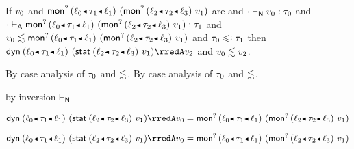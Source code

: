 \begin{lemma}\label{HA-S-compat-2}
  If\/ $v_0$ and\/ ${\emopt{\obnd{\sowner_0}{\stype_1}{\sowner_1}}{(\emopt{\obnd{\sowner_2}{\stype_2}{\sowner_3}}{\svalue_1})}}$ are \reducedsurfaceexpressions{}
  and\/ ${\cdot} \vdash_{\mathsf{N}} v_0 : \tau_0$
  and\/ $\snil \sWTA {\emopt{\obnd{\sowner_0}{\stype_1}{\sowner_1}}{(\emopt{\obnd{\sowner_2}{\stype_2}{\sowner_3}}{\svalue_1})}} : \stype_1$
  and\/ $\rexpr{\svalue_0}{\emopt{\obnd{\sowner_0}{\stype_1}{\sowner_1}}{(\emopt{\obnd{\sowner_2}{\stype_2}{\sowner_3}}{\svalue_1})}}$
  and\/ $\stype_0 \subteq \stype_1$
  then\/ $\edynb{\obnd{\sowner_0}{\stype_1}{\sowner_1}}{(\estab{\obnd{\sowner_2}{\stype_2}{\sowner_3}}{\svalue_1})} \rredA \svalue_2$
  and\/ $v_0 \lesssim v_2$.
\end{lemma}{
  \newcommand{\shortpf}{By case analysis of $\stype_0$ and $\srexpr$.}
\begin{lamportproof*}
  \shortpf
\mainproof
  \shortpf

    \begin{pfproof}
        \begin{pfproof}
          by inversion $\vdash_{\mathsf{N}}$
        \end{pfproof}
        \begin{pfproof}
          \qedstep
            \begin{pfproof}
              $\edynb{\obnd{\sowner_0}{\stype_1}{\sowner_1}}{(\estab{\obnd{\sowner_2}{\stype_2}{\sowner_3}}{\svalue_1})} \rredA \svalue_0 \feq \emopt{\obnd{\sowner_0}{\stype_1}{\sowner_1}}{(\emopt{\obnd{\sowner_2}{\stype_2}{\sowner_3}}{\svalue_1})}$
            \end{pfproof}
        \end{pfproof}
        \begin{pfproof}
          \qedstep
            \begin{pfproof}
              $\edynb{\obnd{\sowner_0}{\stype_1}{\sowner_1}}{(\estab{\obnd{\sowner_2}{\stype_2}{\sowner_3}}{\svalue_1})} \rredA \svalue_0 \feq \emopt{\obnd{\sowner_0}{\stype_1}{\sowner_1}}{(\emopt{\obnd{\sowner_2}{\stype_2}{\sowner_3}}{\svalue_1})}$
            \end{pfproof}
        \end{pfproof}
    \end{pfproof}


\end{lamportproof*}}
